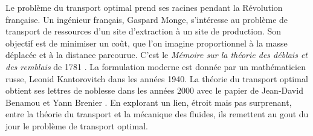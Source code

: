 \documentclass[a4paper,12pt]{article}
\begin{document}
Le problème du transport optimal prend ses racines pendant la Révolution française. Un ingénieur français, Gaspard Monge, s'intéresse au problème de transport de ressources d'un site d'extraction à un site de production. Son objectif est de minimiser un coût, que l'on imagine proportionnel à la masse déplacée et à la distance parcourue. C'est le \emph{Mémoire sur la théorie des déblais et des remblais} de 1781 \cite{monge}. La formulation moderne est donnée par un mathématicien russe, Leonid Kantorovitch dans les années 1940. La théorie du transport optimal obtient ses lettres de noblesse dans les années 2000 avec le papier de Jean-David Benamou et Yann Brenier \cite{benamoubrenier}. En explorant un lien, étroit mais pas surprenant, entre la théorie du transport et la mécanique des fluides, ils remettent au gout du jour le problème de transport optimal.\\
\vspace{-0.8cm}
\end{document}
